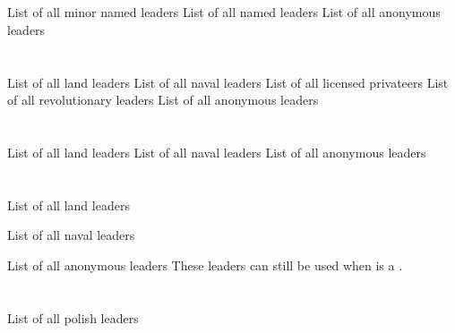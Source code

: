 \section{\paysmajeurAutriche}

\aparag List of all minor named leaders 
\aparag List of all named leaders 
\aparag List of all anonymous leaders \listanonymehabsbourgM




\section{\paysmajeurFrance}

\aparag List of all land leaders 
\aparag List of all naval leaders 
\aparag List of all licensed privateers 
\aparag List of all revolutionary leaders 
\aparag List of all anonymous leaders \listanonymefrance




\section{\paysmajeurEspagne}

\aparag List of all land leaders 
\aparag List of all naval leaders 
\aparag List of all anonymous leaders \listanonymeespagne




\section{\paysmajeurHollande}

\aparag List of all land leaders 

\aparag List of all naval leaders 

\aparag List of all anonymous leaders
\bparag These leaders can still be used when \paysHollande is a \MIN.
\listanonymehollande




\section{\paysmajeurPologne}

\aparag List of all polish leaders 

